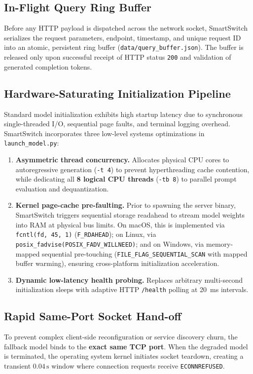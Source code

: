 \documentclass[11pt,a4paper]{article}
\newcommand{\su}{\,\mathrm{s}}
\newcommand{\code}[1]{\texttt{#1}}
\begin{document}
\subsection{In-Flight Query Ring Buffer}
Before any HTTP payload is dispatched across the network socket, SmartSwitch serializes the request parameters, endpoint, timestamp, and unique request ID into an atomic, persistent ring buffer (\code{data/query\_buffer.json}). The buffer is released only upon successful receipt of HTTP status \code{200} and validation of generated completion tokens.

\subsection{Hardware-Saturating Initialization Pipeline}
Standard model initialization exhibits high startup latency due to synchronous single-threaded I/O, sequential page faults, and terminal logging overhead. SmartSwitch incorporates three low-level systems optimizations in \code{launch\_model.py}:
\begin{enumerate}[leftmargin=*]
\item \textbf{Asymmetric thread concurrency.} Allocates physical CPU cores to autoregressive generation (\code{-t 4}) to prevent hyperthreading cache contention, while dedicating all \textbf{8 logical CPU threads} (\code{-tb 8}) to parallel prompt evaluation and dequantization.
\item \textbf{Kernel page-cache pre-faulting.} Prior to spawning the server binary, SmartSwitch triggers sequential storage readahead to stream model weights into RAM at physical bus limits. On macOS, this is implemented via \code{fcntl(fd, 45, 1)} (\code{F\_RDAHEAD}); on Linux, via \code{posix\_fadvise(POSIX\_FADV\_WILLNEED)}; and on Windows, via memory-mapped sequential pre-touching (\code{FILE\_FLAG\_SEQUENTIAL\_SCAN} with mapped buffer warming), ensuring cross-platform initialization acceleration.
\item \textbf{Dynamic low-latency health probing.} Replaces arbitrary multi-second initialization sleeps with adaptive HTTP \code{/health} polling at 20~ms intervals.
\end{enumerate}

\subsection{Rapid Same-Port Socket Hand-off}
To prevent complex client-side reconfiguration or service discovery churn, the fallback model binds to the \textbf{exact same TCP port}. When the degraded model is terminated, the operating system kernel initiates socket teardown, creating a transient $0.04\su$ window where connection requests receive \code{ECONNREFUSED}.
\end{document}
